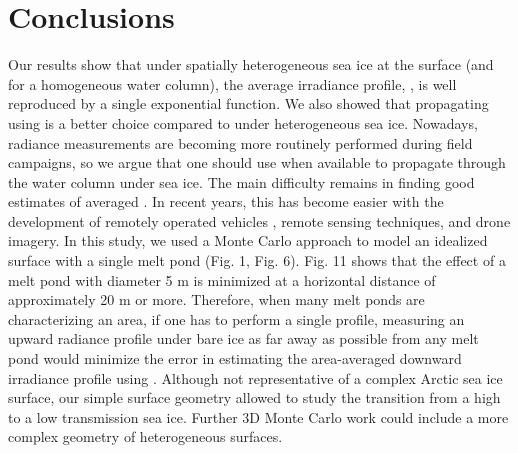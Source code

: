 \section{Conclusions}

Our results show that under spatially heterogeneous sea ice at the surface (and for a homogeneous water column), the average irradiance profile, \meanedz{}, is well reproduced by a single exponential function. We also showed that propagating \edzero{} using \klu{} is a better choice compared to \ked{} under heterogeneous sea ice. Nowadays, radiance measurements are becoming more routinely performed during field campaigns, so we argue that one should use \klu{} when available to propagate \edzero{} through the water column under sea ice. The main difficulty remains in finding good estimates of averaged \edzero{}. In recent years, this has become easier with the development of remotely operated vehicles \citep{Katlein2015, Arndt2017, Nicolaus2013}, remote sensing techniques, and drone imagery. In this study, we used a Monte Carlo approach to model an idealized surface with a single melt pond (Fig. 1, Fig. 6). Fig. 11 shows that the effect of a melt pond with diameter 5 m is minimized at a horizontal distance of approximately 20 m or more. Therefore, when many melt ponds are characterizing an area, if one has to perform a single profile, measuring an upward radiance profile under bare ice as far away as possible from any melt pond would minimize the error in estimating the area-averaged downward irradiance profile using \klu{}. Although not representative of a complex Arctic sea ice surface, our simple surface geometry allowed to study the transition from a high to a low transmission sea ice. Further 3D Monte Carlo work could include a more complex geometry of heterogeneous surfaces.